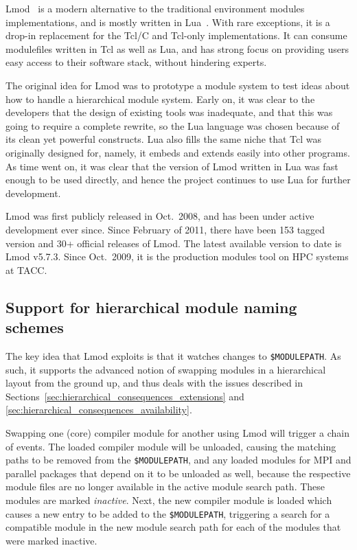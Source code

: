 Lmod~\cite{laytonLmod,taccSecretSauce,taccLmod} is a modern alternative to
the traditional environment modules implementations, and is mostly written in
Lua~\cite{LuaBook}. With rare exceptions, it is a drop-in replacement for the Tcl/C
and Tcl-only implementations. It can consume modulefiles written in Tcl as well as
Lua, and has strong focus on providing users easy access to their software stack,
without hindering experts.

The original idea for Lmod was to prototype a module system to test
ideas about how to handle a hierarchical module system.  Early on, it was clear
to the developers that the design of existing tools was inadequate, and that this
was going to require a complete rewrite, so the Lua language was chosen because
of its clean yet powerful constructs.  Lua also fills the same niche that Tcl was
originally designed for, namely, it embeds and extends easily into
other programs.  As time went on, it was clear that the version of Lmod written
in Lua was fast enough to be used directly, and hence the project
continues to use Lua for further development.

Lmod was first publicly released in Oct.~2008, and has been under active development
ever since. Since February of 2011, there have been 153 tagged version and
30+ official releases of Lmod. The latest available version to date is Lmod v5.7.3.
Since Oct.~2009, it is the production modules tool on HPC systems at TACC.

\subsection{Support for hierarchical module naming schemes}

The key idea that Lmod exploits is that it watches changes to
\texttt{\small \$MODULEPATH}. As such, it supports the advanced notion of
swapping modules in a hierarchical layout from the ground up, and thus
deals with the issues described in
Sections~\ref{sec:hierarchical_consequences_extensions} and
\ref{sec:hierarchical_consequences_availability}.

Swapping one (core) compiler module for another using Lmod will trigger
a chain of events.  The loaded compiler module will be unloaded, 
causing the matching paths to be removed from the \texttt{\small \$MODULEPATH},
and any loaded modules for MPI and parallel packages that depend on it
to be unloaded as well, because the respective module files are no longer available
in the active module search path. These modules are marked \emph{inactive}.
Next, the new compiler module is loaded which causes a new entry
to be added to the \texttt{\small \$MODULEPATH}, triggering a search
for a compatible module in the new module search path for each of the
modules that were marked inactive.

